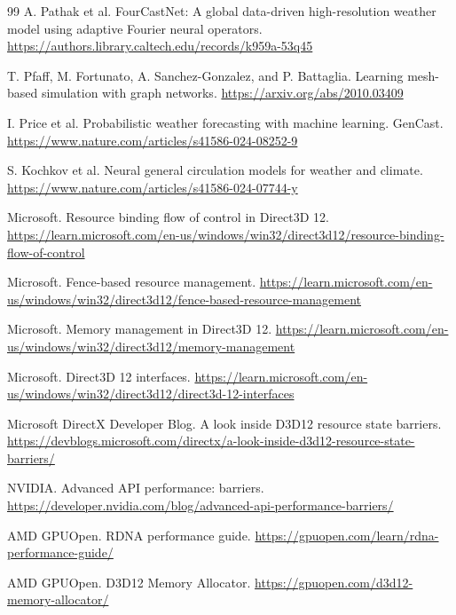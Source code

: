 \documentclass[11pt]{article}
\begin{document}
\begin{thebibliography}{99}
A. Pathak et al.
\newblock FourCastNet: A global data-driven high-resolution weather model using adaptive Fourier neural operators.
\newblock \url{https://authors.library.caltech.edu/records/k959a-53q45}

T. Pfaff, M. Fortunato, A. Sanchez-Gonzalez, and P. Battaglia.
\newblock Learning mesh-based simulation with graph networks.
\newblock \url{https://arxiv.org/abs/2010.03409}

I. Price et al.
\newblock Probabilistic weather forecasting with machine learning.
\newblock GenCast.
\newblock \url{https://www.nature.com/articles/s41586-024-08252-9}

S. Kochkov et al.
\newblock Neural general circulation models for weather and climate.
\newblock \url{https://www.nature.com/articles/s41586-024-07744-y}

Microsoft.
\newblock Resource binding flow of control in Direct3D 12.
\newblock \url{https://learn.microsoft.com/en-us/windows/win32/direct3d12/resource-binding-flow-of-control}

Microsoft.
\newblock Fence-based resource management.
\newblock \url{https://learn.microsoft.com/en-us/windows/win32/direct3d12/fence-based-resource-management}

Microsoft.
\newblock Memory management in Direct3D 12.
\newblock \url{https://learn.microsoft.com/en-us/windows/win32/direct3d12/memory-management}

Microsoft.
\newblock Direct3D 12 interfaces.
\newblock \url{https://learn.microsoft.com/en-us/windows/win32/direct3d12/direct3d-12-interfaces}

Microsoft DirectX Developer Blog.
\newblock A look inside D3D12 resource state barriers.
\newblock \url{https://devblogs.microsoft.com/directx/a-look-inside-d3d12-resource-state-barriers/}

NVIDIA.
\newblock Advanced API performance: barriers.
\newblock \url{https://developer.nvidia.com/blog/advanced-api-performance-barriers/}

AMD GPUOpen.
\newblock RDNA performance guide.
\newblock \url{https://gpuopen.com/learn/rdna-performance-guide/}

AMD GPUOpen.
\newblock D3D12 Memory Allocator.
\newblock \url{https://gpuopen.com/d3d12-memory-allocator/}


\end{thebibliography}
\end{document}
